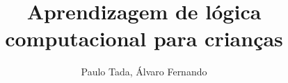 \sloppy

\title{Aprendizagem de lógica computacional para crianças}

\author{Paulo Tada, Álvaro Fernando}

\address{Faculdade Gama - Universidade de Brasília (UnB)}

